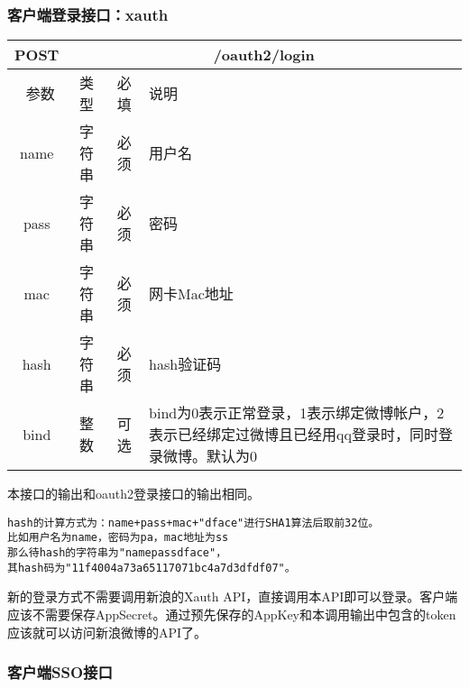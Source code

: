 \subsubsection{客户端登录接口：xauth}
\label{hash_algorithm}

\begin{table}[H]
   \begin{center}
\begin{tabular}{|c|c|c|p{12cm}|}
\hline
POST & \multicolumn{3}{|c|}{/oauth2/login} \\
\hline\hline
 \  参数  & 类型 & 必填 &  说明  \\
\hline
 name  & 字符串 & 必须 &  用户名\\
 \hline
 pass  & 字符串 & 必须 &  密码\\
  \hline
 mac  & 字符串 & 必须 &  网卡Mac地址\\
 \hline
 hash  & 字符串 & 必须 &  hash验证码\\
\hline
 bind  & 整数 & 可选 &  bind为0表示正常登录，1表示绑定微博帐户，2表示已经绑定过微博且已经用qq登录时，同时登录微博。默认为0\\
\hline
\end{tabular}
   \end{center}
\end{table}

本接口的输出和oauth2登录接口的输出相同。

\begin{verbatim}
hash的计算方式为：name+pass+mac+"dface"进行SHA1算法后取前32位。
比如用户名为name，密码为pa，mac地址为ss
那么待hash的字符串为"namepassdface"，
其hash码为"11f4004a73a65117071bc4a7d3dfdf07"。
\end{verbatim}

新的登录方式不需要调用新浪的Xauth API，直接调用本API即可以登录。客户端应该不需要保存AppSecret。通过预先保存的AppKey和本调用输出中包含的token应该就可以访问新浪微博的API了。




\subsubsection{客户端SSO接口}
\label{hash_algorithm}

